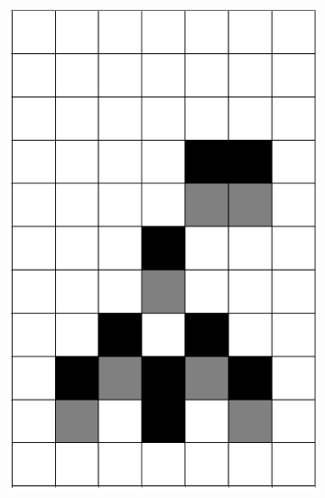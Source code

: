 \documentclass[12pt]{article}
\numberwithin{figure}{section} %
\begin{document}
\begin{figure}[H]
   \setcounter{subfigure}{0}
         \begin{subfigure}{0.3\textwidth}
     \centering
     \includegraphics[angle=270,width=\linewidth]{Section4/6.0}
     \subcaption{}
   \end{subfigure}
     \begin{subfigure}{0.3\textwidth}
     \centering

\end{subfigure}
\end{figure}
\end{document}
